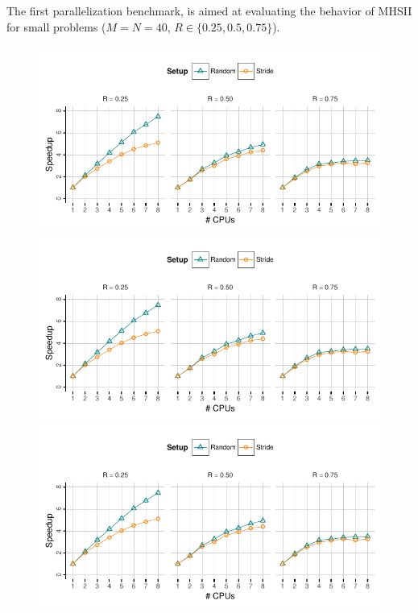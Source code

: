 The first parallelization benchmark, is aimed at evaluating the
behavior of \ac{MHSII} for small problems ($M = N = 40$, $R \in
\{0.25,0.5,0.75\}$).


\begin{figure}[!ht]
  \includegraphics[trim=0.5em 2.65em 0em 0em, clip,
  page=1]{figures/mhs2/figures/parallel_small.pdf}
  \\[0.5em]
  \includegraphics[trim=0.5em 2.65em 0em 5.5em, clip, page=2]{figures/mhs2/figures/parallel_small.pdf}
  \\[0.5em]
  \includegraphics[trim=0.5em 2.65em 0em 5.5em, clip, page=4]{figures/mhs2/figures/parallel_small.pdf}

\end{figure}
